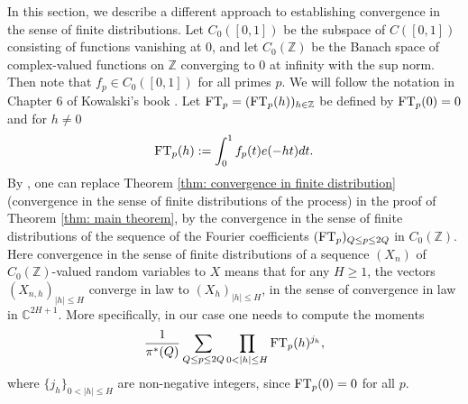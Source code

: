 \documentclass[JEP,XML,SOM,Unicode,NoFloatCountersInSection,published]{cedram}
\theoremstyle{plain}
\theoremstyle{definition}
\begin{document}
In this section, we describe a different approach to establishing convergence in the sense of finite distributions.
Let $C_0([0,1])$ be the subspace of $C([0,1])$ consisting of functions vanishing at
$0$, and let $C_0(\mathbb{Z})$ be the Banach space of complex-valued functions on
$\mathbb{Z}$ converging to $0$ at infinity with the sup norm. Then note that $f_p\in C_0([0,1])$ for all primes $p$. We will follow the notation in Chapter 6 of Kowalski's book \cite{Ko}.
Let $\textup{FT}_p= (\textup{FT}_p(h))_{h\in \mathbb{Z}}$ be defined by $\textup{FT}_p(0)=0$ and for $h\neq 0$
\[
\textup{FT}_p(h):= \int_0^1 f_p(t) e(-ht)dt. \]
By \cite[Prop.\,B.11.8]{Ko}, one can replace Theorem \ref{thm: convergence in finite distribution} (convergence in the sense of finite distributions of the process) in the proof of Theorem \ref{thm: main theorem}, by the convergence in the sense of finite distributions of the sequence of the Fourier coefficients $(\textup{FT}_p)_{Q\leq p\leq 2Q}$ in $C_0(\mathbb{Z})$. Here convergence in the sense of finite distributions of a sequence $(X_n)$ of $C_0(\mathbb{Z})$-valued random variables to $X$ means that for any $H\geq 1$, the vectors $(X_{n,h})_{|h|\leq H}$ converge in law to $(X_h)_{|h|\leq H}$, in the sense of convergence in law in $\mathbb{C}^{2H+1}$.
More specifically, in our case one needs to compute the moments
\begin{equation}\label{Eq.MomentsFourier}\frac{1}{\pi^*(Q)}\sum_{Q\leq p\leq 2Q} \prod_{0<|h|\leq H}\textup{FT}_p (h)^{j_h},
\end{equation}
where $\{j_h\}_{0<|h|\leq H}$ are non-negative integers, since $\textup{FT}_p(0)=0$ for all $p$.
\end{document}

